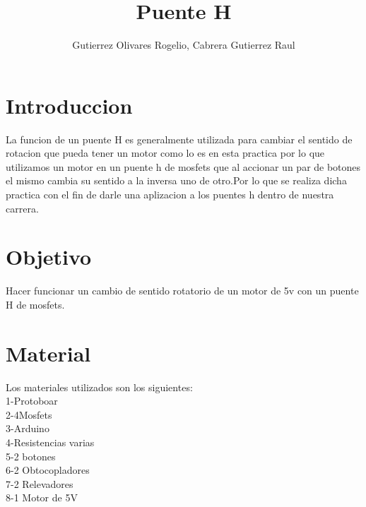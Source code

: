 \documentclass[12pt,a4paper]{report}
\author{Gutierrez Olivares Rogelio, Cabrera Gutierrez Raul}
\title{Puente H}
\begin{document}
\maketitle
\section{Introduccion }
La funcion de un puente H es generalmente utilizada para cambiar el sentido de rotacion que pueda tener un motor como lo es en esta practica por lo que utilizamos un motor en un puente h de mosfets que al accionar un par de botones el mismo cambia su sentido a la inversa uno de otro.Por lo que se realiza dicha practica con el fin de darle una aplizacion a los puentes h dentro de nuestra carrera.

\section{Objetivo}
Hacer funcionar un cambio de sentido rotatorio de un motor de 5v con un puente H de mosfets.

\section{Material}
Los materiales utilizados son los siguientes:\\
1-Protoboar
\\
2-4Mosfets
\\
3-Arduino
\\
4-Resistencias varias
\\
5-2 botones 
\\
6-2 Obtocopladores
\\
7-2 Relevadores
\\
8-1 Motor de 5V
\end{document}
